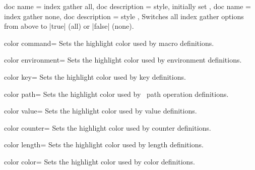 \begin{docTcbKeys}[
    doc new={2022-06-20},
    doc parameter = {},
  ]
  {
    {
      doc name        = index gather all,
      doc description = {style, initially set}
    },
    {
      doc name        = index gather none,
      doc description = {style}
    },
  }
  Switches all index gather options from above to |true| (all) or |false| (none).
\end{docTcbKeys}

\clearpage

\begin{docTcbKey}{color command}{=}{}
  Sets the highlight color used by macro definitions.
\end{docTcbKey}

\begin{docTcbKey}{color environment}{=}{}
  Sets the highlight color used by environment definitions.
\end{docTcbKey}

\begin{docTcbKey}{color key}{=}{}
  Sets the highlight color used by key definitions.
\end{docTcbKey}

\begin{docTcbKey}[][doc new={2019-09-18}]{color path}{=}{}
  Sets the highlight color used by \tikzname\ path operation definitions.
\end{docTcbKey}

\begin{docTcbKey}{color value}{=}{}
  Sets the highlight color used by value definitions.
\end{docTcbKey}

\begin{docTcbKey}[][doc new={2015-01-08}]{color counter}{=}{}
  Sets the highlight color used by counter definitions.
\end{docTcbKey}

\begin{docTcbKey}[][doc new={2015-01-08}]{color length}{=}{}
  Sets the highlight color used by length definitions.
\end{docTcbKey}

\begin{docTcbKey}{color color}{=}{}
  Sets the highlight color used by color definitions.
\end{docTcbKey}

